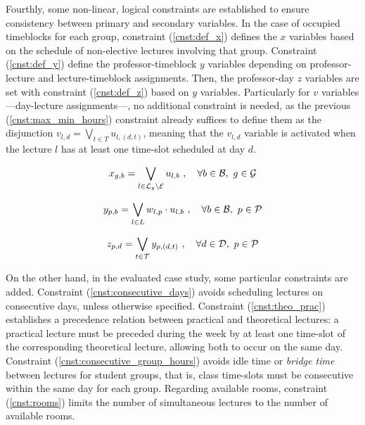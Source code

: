 Fourthly, some non-linear, logical constraints are established to ensure consistency between primary and secondary variables. In the case of occupied timeblocks for each group, constraint (\ref{cnst:def_x}) defines the $x$ variables based on the schedule of non-elective lectures involving that group. Constraint (\ref{cnst:def_y}) define the professor-timeblock $y$ variables depending on professor-lecture and lecture-timeblock assignments. Then, the professor-day $z$ variables are set with constraint (\ref{cnst:def_z}) based on $y$ variables.
Particularly for $v$ variables ---day-lecture assignments---, no additional constraint is needed, as the previous (\ref{cnst:max_min_hours}) constraint already suffices to define them as the disjunction $v_{l,d}=\bigvee_{t \in T} u_{l,(d,t)}$, meaning that the $v_{l,d}$ variable is activated when the lecture $l$ has at least one time-slot scheduled at day $d$.

\begin{equation}
    x_{g,b} = \bigvee_{l\in\mathcal{L}_g\setminus\mathcal{E}} u_{l,b} \ , \quad \forall b \in \mathcal{B}, \ g\in\mathcal{G}
    \label{cnst:def_x}
\end{equation}

\begin{equation}
    y_{p,b} = \bigvee_{l \in L} w_{l,p} \cdot u_{l,b} \ , \quad \forall b\in\mathcal{B}, \ p \in \mathcal{P}
    \label{cnst:def_y}
\end{equation}

\begin{equation}
    z_{p,d} = \bigvee_{t\in\mathcal{T}} y_{p,(d,t)} \ , \quad \forall d\in\mathcal{D}, \ p \in \mathcal{P}
    \label{cnst:def_z}
\end{equation}

On the other hand, in the evaluated case study, some particular constraints are added. Constraint (\ref{cnst:consecutive_days}) avoids scheduling lectures on consecutive days, unless otherwise specified. Constraint (\ref{cnst:theo_prac}) establishes a precedence relation between practical and theoretical lectures: a practical lecture must be preceded during the week by at least one time-slot of the corresponding theoretical lecture, allowing both to occur on the same day. Constraint (\ref{cnst:consecutive_group_hours}) avoids idle time or \textit{bridge time} between lectures for student groups, that is, class time-slots must be consecutive within the same day for each group. Regarding available rooms, constraint (\ref{cnst:rooms}) limits the number of simultaneous lectures to the number of available rooms.


